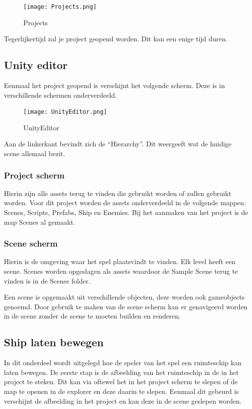 \begin{figure}[H]
    \centering
    \texttt{[image: Projects.png]}
    \caption{Projects}
    \label{fig:Projects}
\end{figure}
Tegerlijkertijd zal je project geopend worden. Dit kan een enige tijd duren.

\subsection{Unity editor}
Eenmaal het project geopend is verschijnt het volgende scherm. Deze is in verschillende schermen onderverdeeld.
\begin{figure}[H]
    \centering
    \texttt{[image: UnityEditor.png]}
    \caption{UnityEditor}
    \label{fig:UnityEditor}
\end{figure}
Aan de linkerkant bevindt zich de “Hierarchy”. Dit weergeeft wat de huidige scene allemaal bezit.

\subsubsection{Project scherm}
Hierin zijn alle assets terug te vinden die gebruikt worden of zullen gebruikt worden. Voor dit project worden de assets onderverdeeld in de volgende mappen: Scenes, Scripts, Prefabs, Ship en Enemies. Bij het aanmaken van het project is de map Scenes al gemaakt.

\subsubsection{Scene scherm}
Hierin is de omgeving waar het spel plaatsvindt te vinden. Elk level heeft een scene. Scenes worden opgeslagen als assets waardoor de Sample Scene terug te vinden is in de Scenes folder.

Een scene is opgemaakt uit verschillende objecten, deze worden ook gameobjects genoemd. Door gebruik te maken van de scene scherm kan er genavigeerd worden in de scene zonder de scene te moeten builden en renderen.

\subsection{Ship laten bewegen}
In dit onderdeel wordt uitgelegd hoe de speler van het spel een ruimteschip kan laten bewegen. De eerste stap is de afbeelding van het ruimteschip in de in het project te steken. Dit kan via oftewel het in het project scherm te slepen of de map te openen in de explorer en deze daarin te slepen. Eenmaal dit gebeurd is verschijnt de afbeelding in het project en kan deze in de scene geslepen worden.  


